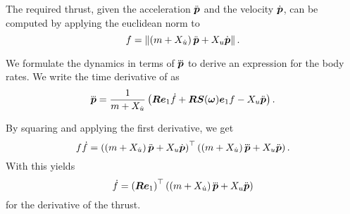 The required thrust, given the acceleration $\mbox{$\ddot{\bm{p}}$}$ and the velocity $\mbox{$\dot{\bm{p}}$}$, can be computed by applying the euclidean norm to 
\begin{equation}
	\label{eq:trajectory-thrust}
	f =
	\left\lVert
	\left(m + X_{\dot{u}}\right) \mbox{$\ddot{\bm{p}}$} + X_u \mbox{$\dot{\bm{p}}$}
	\right\rVert.
\end{equation}

We formulate the dynamics in terms of $\mbox{$\dddot{\bm{p}}$}$ to derive an expression for the body rates.
We write the time derivative of  as
\begin{equation}
	\label{eq:jerk}
	\mbox{$\dddot{\bm{p}}$} = 
	\frac{1}{m + X_{\dot{u}}}
	\left(
		\mbox{$\bm{R}$} \mbox{$\bm{e}$}_1 \mbox{$\dot{f}$} 
		+ \mbox{$\bm{R}$} \mbox{$\bm{S}$}(\mbox{$\bm{\omega}$})\mbox{$\bm{e}$}_1 f
		- X_u \mbox{$\ddot{\bm{p}}$}
	\right)
	.
\end{equation}

By squaring  and applying the first derivative, we get
\begin{equation}
	f\mbox{$\dot{f}$} = 
	\left(
		\left(m + X_{\dot{u}}\right) \mbox{$\ddot{\bm{p}}$}
		+ X_u \mbox{$\dot{\bm{p}}$}
	\right)^\top
	\left(
		\left(m + X_{\dot{u}}\right) \mbox{$\dddot{\bm{p}}$}
		+ X_u \mbox{$\ddot{\bm{p}}$}
	\right).
\end{equation}
With  this yields
\begin{equation}
	\label{eq:fdot}
	\mbox{$\dot{f}$} = \left(\mbox{$\bm{R}$} \mbox{$\bm{e}$}_1\right)^\top
	\left(
		\left(m + X_{\dot{u}}\right) \mbox{$\dddot{\bm{p}}$}
		+ X_u \mbox{$\ddot{\bm{p}}$}
	\right)
\end{equation}
for the derivative of the thrust.

